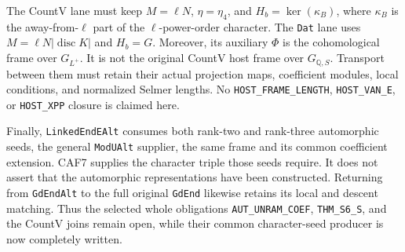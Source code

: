 The CountV lane must keep \(M=\ell N\), \(\eta=\eta_4\), and
\(H_b=\ker(\kappa_B)\), where \(\kappa_B\) is the away-from-\(\ell\)
part of the \(\ell\)-power-order character.  The \texttt{Dat}
lane uses \(M=\ell N|\operatorname{disc}K|\) and \(H_b=G\).
Moreover, its auxiliary \(\Phi\) is the cohomological frame over
\(G_{L^+}\).  It is not the original CountV host frame over
\(G_{\mathbb Q,S}\).  Transport between them must retain their
actual projection maps, coefficient modules, local conditions, and
normalized Selmer lengths.  No \texttt{HOST\_FRAME\_LENGTH},
\texttt{HOST\_VAN\_E}, or \texttt{HOST\_XPP} closure is claimed here.

Finally, \texttt{LinkedEndEAlt} consumes both rank-two and rank-three
automorphic seeds, the general \texttt{ModUAlt} supplier, the same
frame and its common coefficient extension.  CAF7 supplies the
character triple those seeds require.  It does not assert that the
automorphic representations have been constructed.  Returning from
\texttt{GdEndAlt} to the full original \texttt{GdEnd} likewise
retains its local and descent matching.  Thus the selected whole
obligations \texttt{AUT\_UNRAM\_COEF}, \texttt{THM\_S6\_S}, and
the CountV joins remain open, while their common character-seed
producer is now completely written.
